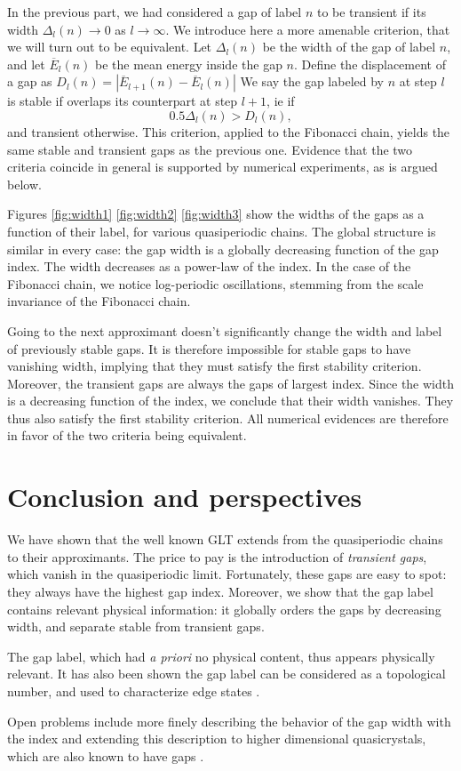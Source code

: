 \documentclass[a4paper]{jpconf}
\begin{document}
In the previous part, we had considered a gap of label $n$ to be transient if its width $\Delta_l(n) \to 0$ as $l \to \infty$.
We introduce here a more amenable criterion, that we will turn out to be equivalent.
Let $\Delta_l(n)$ be the width of the gap of label $n$, and let $\overline{E}_l(n)$ be the mean energy inside the gap $n$.
Define the displacement of a gap as $D_l(n) = |\overline{E}_{l+1}(n) - \overline{E}_l(n)| $
We say the gap labeled by $n$ at step $l$ is stable if overlaps its counterpart at step $l+1$, ie if 
\begin{equation}
\label{eq:overlapcriterion}
	0.5 \Delta_l(n) > D_l(n),
\end{equation}
and transient otherwise.
This criterion, applied to the Fibonacci chain, yields the same stable and transient gaps as the previous one.
Evidence that the two criteria coincide in general is supported by numerical experiments, as is argued below.

Figures \eqref{fig:width1} \eqref{fig:width2} \eqref{fig:width3} show the widths of the gaps as a function of their label, for various quasiperiodic chains.
The global structure is similar in every case: the gap width is a globally decreasing function of the gap index. 
The width decreases as a power-law of the index.
In the case of the Fibonacci chain, we notice log-periodic oscillations, stemming from the scale invariance of the Fibonacci chain.

Going to the next approximant doesn't significantly change the width and label of previously stable gaps.
It is therefore impossible for stable gaps to have vanishing width, implying that they must satisfy the first stability criterion.
Moreover, the transient gaps are always the gaps of largest index.
Since the width is a decreasing function of the index, we conclude that their width vanishes. They thus also satisfy the first stability criterion.
All numerical evidences are therefore in favor of the two criteria being equivalent.


\section*{Conclusion and perspectives}

We have shown that the well known GLT extends from the quasiperiodic chains to their approximants.
The price to pay is the introduction of \emph{transient gaps}, which vanish in the quasiperiodic limit. 
Fortunately, these gaps are easy to spot: they always have the highest gap index.
Moreover, we show that the gap label contains relevant physical information: it globally orders the gaps by decreasing width, and separate stable from transient gaps.

The gap label, which had \emph{a priori} no physical content, thus appears physically relevant.
It has also been shown the gap label can be considered as a topological number, and used to characterize edge states \cite{silberberg2015, Levy2015}.

Open problems include more finely describing the behavior of the gap width with the index and extending this description to higher dimensional quasicrystals, which are also known to have gaps \cite{Zijlstra, penrosegaps}.

\printbibliography
\end{document}
